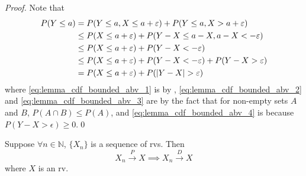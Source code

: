 \documentclass[notoc,notitlepage]{tufte-book}
\newcommand{\convd}{\overset{D}{\to}}
\newcommand{\convp}{\overset{P}{\to}}
\begin{document}
\begin{proof}
  Note that
  \begin{align}
    P(Y \leq a) &= P(Y \leq a, X \leq a + \varepsilon) + P( Y \leq a, X > a + \varepsilon ) \label{eq:lemma_cdf_bounded_abv_1} \\
                &\leq P(X \leq a + \varepsilon) + P( Y - X \leq a - X , a - X < - \varepsilon ) \label{eq:lemma_cdf_bounded_abv_2} \\
                &\leq P(X \leq a + \varepsilon) + P( Y - X < - \varepsilon ) \label{eq:lemma_cdf_bounded_abv_3} \\
                &\leq P(X \leq a + \varepsilon) + P( Y - X < - \varepsilon ) + P( Y - X > \varepsilon ) \label{eq:lemma_cdf_bounded_abv_4} \\
                &= P(X \leq a + \varepsilon) + P( \left|Y - X\right| > \varepsilon ) \nonumber
  \end{align}
  where \cref{eq:lemma_cdf_bounded_abv_1} is by , \cref{eq:lemma_cdf_bounded_abv_2} and \cref{eq:lemma_cdf_bounded_abv_3} are by the fact that for non-empty sets $A$ and $B$, $P(A \cap B) \leq P(A)$, and \cref{eq:lemma_cdf_bounded_abv_4} is because $P(Y - X > \epsilon) \geq 0$.\qed
\end{proof}

\begin{propo}
\label{propo:convergence_in_probability_implies_convergence_in_distribution}
  Suppose $\forall n \in \mathbb{N}$, $\{ X_n \}$ is a sequence of rvs. Then
  \begin{equation*}
    X_n \convp X \implies X_n \convd X
  \end{equation*}
  where $X$ is an rv.
\end{propo}
\end{document}
